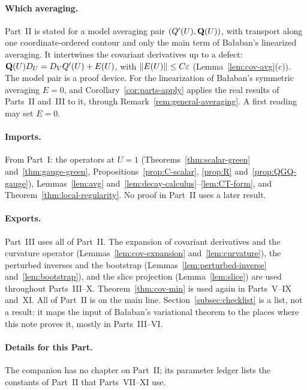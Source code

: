 \paragraph{Which averaging.} Part~II is stated for a model averaging pair $(Q'(U),\mathbf Q(U))$, with transport along one coordinate-ordered contour and only the main term of Ba\l aban's linearized averaging. It intertwines the covariant derivatives up to a defect: $\mathbf Q(U)D_U=D_VQ'(U)+E(U)$, with $\|E(U)\|\le C\varepsilon$ (Lemma~\ref{lem:cov-avg}(c)). The model pair is a proof device. For the linearization of Ba\l aban's symmetric averaging $E=0$, and Corollary~\ref{cor:parts-apply} applies the real results of Parts~II and~III to it, through Remark~\ref{rem:general-averaging}. A first reading may set $E=0$.

\paragraph{Imports.} From Part~I: the operators at $U=1$ (Theorems~\ref{thm:scalar-green} and~\ref{thm:gauge-green}, Propositions~\ref{prop:C-scalar}, \ref{prop:R} and~\ref{prop:QGQ-gauge}), Lemmas~\ref{lem:avg} and~\ref{lem:decay-calculus}--\ref{lem:CT-form}, and Theorem~\ref{thm:local-regularity}. No proof in Part~II uses a later result.

\paragraph{Exports.} Part~III uses all of Part~II. The expansion of covariant derivatives and the curvature operator (Lemmas~\ref{lem:cov-expansion} and~\ref{lem:curvature}), the perturbed inverses and the bootstrap (Lemmas~\ref{lem:perturbed-inverse} and~\ref{lem:bootstrap}), and the slice projection (Lemma~\ref{lem:slice}) are used throughout Parts~III--X. Theorem~\ref{thm:cov-min} is used again in Parts~V--IX and~XI. All of Part~II is on the main line. Section~\ref{subsec:checklist} is a list, not a result: it maps the input of Ba\l aban's variational theorem to the places where this note proves it, mostly in Parts~III--VI.

\paragraph{Details for this Part.} The companion has no chapter on Part~II; its parameter ledger lists the constants of Part~II that Parts~VII--XI use.
